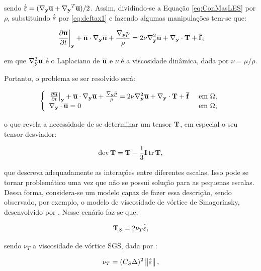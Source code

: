 \documentclass[_ArquivoPrincipal.tex]{subfiles}
\begin{document}
\noindent sendo $\dot{\bar{\mathbf{\varepsilon}}}=(\mathbf{\nabla_y}\overline{\mathbf{u}}+\mathbf{\nabla_y}^T\overline{\mathbf{u}})/2$. Assim, dividindo-se a Equação \ref{eq:ConMasLES} por $\rho$, substituindo $\dot{\bar{\mathbf{\varepsilon}}}$ por \ref{eq:deftax1} e fazendo algumas manipulações tem-se que:

\begin{equation}
    \left.\frac{\partial{\overline{\mathbf{u}}}}{\partial{t}}\right|_{\mathbf{y}}+\overline{\mathbf{u}}\cdot\mathbf{\nabla_y}\overline{\mathbf{u}}+\frac{\mathbf{\nabla_y} \bar{p}}{\rho}=2\nu\mathbf{\nabla}^2_\mathbf{y}\overline{\mathbf{u}}+\mathbf{\nabla_y}\cdot\mathbf{T}+\overline{\mathbf{f}}\text{,}
\end{equation}

\noindent em que $\mathbf{\nabla}^2_\mathbf{y}\overline{\mathbf{u}}$ é o Laplaciano de $\overline{\mathbf{u}}$ e $\nu$ é a viscosidade dinâmica, dada por $\nu=\mu/\rho$.

Portanto, o problema se ser resolvido será:

\begin{equation}
    \left\{
   \begin{array}{ll}
        \left.\frac{\partial{\overline{\mathbf{u}}}}{\partial{t}}\right|_{\mathbf{y}}+\overline{\mathbf{u}}\cdot\mathbf{\nabla_y}\overline{\mathbf{u}}+\frac{\mathbf{\nabla_y} \bar{p}}{\rho}=2\nu\mathbf{\nabla}^2_\mathbf{y}\overline{\mathbf{u}}+\mathbf{\nabla_y}\cdot\mathbf{T}+\overline{\mathbf{f}}&\text{ em }\Omega\text{,}\\
        \mathbf{\nabla_y}\cdot\overline{\mathbf{u}}=0&\text{ em }\Omega\text{,}
    \end{array}
    \right.
\end{equation}

\noindent o que revela a necessidade de se determinar um tensor $\mathbf{T}$, em especial o seu tensor desviador:

\begin{equation}
    \mathop{\mathrm{dev}}\nolimits{\mathbf{T}}=\mathbf{T}-\frac{1}{3}\mathbf{I}\mathop{\mathrm{tr}}\nolimits{\mathbf{T}}\text{,}
\end{equation}

\noindent que descreva adequadamente as interações entre diferentes escalas. Isso pode se tornar problemático uma vez que não se possui solução para as pequenas escalas. Dessa forma, considera-se um modelo capaz de fazer essa descrição, sendo observado, por exemplo, o modelo de viscosidade de vórtice de Smagorinsky, desenvolvido por . Nesse cenário faz-se que:

\begin{equation}
    \mathbf{T}_S=2\nu_T\dot{\bar{\mathbf{\varepsilon}}}\text{,}
\end{equation}

\noindent sendo $\nu_T$ a viscosidade de vórtice SGS, dada por \cite{germano1991dynamic,piomelli1999large,hughes2000large}:

\begin{equation}
    \nu_T=(C_S\Delta)^2\left\lVert{\dot{\bar{\mathbf{\varepsilon}}}}\right\lVert\text{,}
\end{equation}
\end{document}
